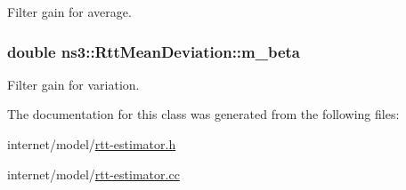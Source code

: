 Filter gain for average. 

\subsubsection[{\texorpdfstring{m\+\_\+beta}{m_beta}}]{\setlength{\rightskip}{0pt plus 5cm}double ns3\+::\+Rtt\+Mean\+Deviation\+::m\+\_\+beta\hspace{0.3cm}{\ttfamily [private]}}\hypertarget{classns3_1_1RttMeanDeviation_a38c17beed105df7cadd05207774f2147}{}\label{classns3_1_1RttMeanDeviation_a38c17beed105df7cadd05207774f2147}


Filter gain for variation. 



The documentation for this class was generated from the following files\+:\begin{DoxyCompactItemize}
\item 
internet/model/\hyperlink{rtt-estimator_8h}{rtt-\/estimator.\+h}\item 
internet/model/\hyperlink{rtt-estimator_8cc}{rtt-\/estimator.\+cc}\end{DoxyCompactItemize}
